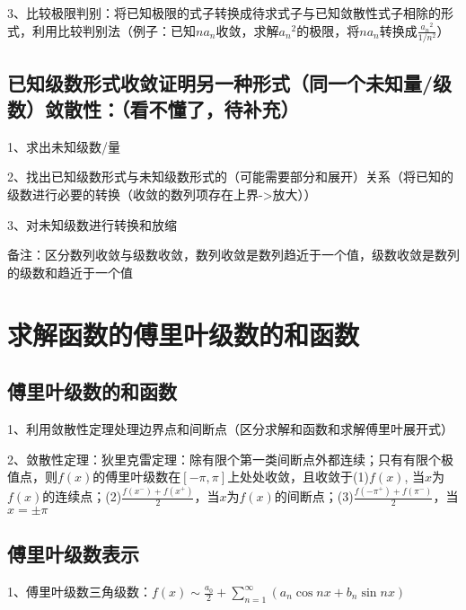 3、比较极限判别：将已知极限的式子转换成待求式子与已知敛散性式子相除的形式，利用比较判别法（例子：已知$na_n$收敛，求解${a_n}^2$的极限，将$na_n$转换成$\frac{{a_n}^2}{ 1/n^2 }$）



\subsection{已知级数形式收敛证明另一种形式（同一个未知量/级数）敛散性：（看不懂了，待补充）}

1、求出未知级数/量

2、找出已知级数形式与未知级数形式的（可能需要部分和展开）关系（将已知的级数进行必要的转换（收敛的数列项存在上界->放大））

3、对未知级数进行转换和放缩



备注：区分数列收敛与级数收敛，数列收敛是数列趋近于一个值，级数收敛是数列的级数和趋近于一个值

\section{求解函数的傅里叶级数的和函数}



\subsection{傅里叶级数的和函数}

1、利用敛散性定理处理边界点和间断点（区分求解和函数和求解傅里叶展开式）

2、敛散性定理：狄里克雷定理：除有限个第一类间断点外都连续；只有有限个极值点，则$f(x)$的傅里叶级数在$[-\pi, \pi]$上处处收敛，且收敛于(1)$f(x)$, 当$x$为$f(x)$的连续点；(2)$ \frac{f\left(x^{-}\right)+f\left(x^{+}\right)}{2}$，当$x$为$f(x)$的间断点；(3)$\frac{f\left(-\pi^{+}\right)+f\left(\pi^{-}\right)}{2}$，当$x=\pm \pi$



\subsection{傅里叶级数表示}

1、傅里叶级数三角级数：$f(x) \sim \frac{a_{0}}{2}+\sum_{n=1}^{\infty}\left(a_{n} \cos n x+b_{n} \sin n x\right)$

